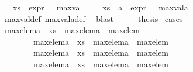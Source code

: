 \begin{isabellebody}
{\isachardoublequoteopen}{\isacharparenleft}{\kern0pt}{\isasymnexists}{\isasympsi}{\isachardot}{\kern0pt}\ {\isasympsi}\ {\isasymin}\ xs\ {\isasymand}\ expr{\isacharunderscore}{\kern0pt}{}\ {\isasympsi}\ {\isacharequal}{\kern0pt}\ max{\isacharunderscore}{\kern0pt}val{\isacharparenright}{\kern0pt}\ {\isasymand}\ {\isacharparenleft}{\kern0pt}{\isasymnexists}{\isasympsi}{\isachardot}{\kern0pt}\ {\isasympsi}\ {\isasymin}\ {\isacharparenleft}{\kern0pt}xs\ {\isasymunion}\ {\isacharbraceleft}{\kern0pt}a{\isacharbraceright}{\kern0pt}{\isacharparenright}{\kern0pt}\ {\isasymand}\ expr{\isacharunderscore}{\kern0pt}{}\ {\isasympsi}\ {\isacharequal}{\kern0pt}\ max{\isacharunderscore}{\kern0pt}val{\isacharunderscore}{\kern0pt}a{\isacharparenright}{\kern0pt}{\isachardoublequoteclose}\isanewline
\ \ \ \ \isamarkupfalse%
\ max{\isacharunderscore}{\kern0pt}val{\isacharunderscore}{\kern0pt}def\ max{\isacharunderscore}{\kern0pt}val{\isacharunderscore}{\kern0pt}a{\isacharunderscore}{\kern0pt}def\ \isamarkupfalse%
\ blast\isanewline
\ \ \isamarkupfalse%
\ \isamarkupfalse%
\ {\isacharquery}{\kern0pt}thesis\ \isamarkupfalse%
{\isacharparenleft}{\kern0pt}cases{\isacharparenright}{\kern0pt}\isanewline
\ \ \ \ \isamarkupfalse%
\ {}\isanewline
\ \ \ \ \isamarkupfalse%
\ {\isachardoublequoteopen}max{\isacharunderscore}{\kern0pt}elem{\isacharunderscore}{\kern0pt}a\ {\isasymin}\ xs\ {\isasymand}\ max{\isacharunderscore}{\kern0pt}elem{\isacharunderscore}{\kern0pt}a\ {\isacharequal}{\kern0pt}\ max{\isacharunderscore}{\kern0pt}elem{\isachardoublequoteclose}\ {\isacharbar}{\kern0pt}\isanewline
\ \ \ \ \ \ \ \ {\isachardoublequoteopen}max{\isacharunderscore}{\kern0pt}elem{\isacharunderscore}{\kern0pt}a\ {\isasymin}\ xs\ {\isasymand}\ max{\isacharunderscore}{\kern0pt}elem{\isacharunderscore}{\kern0pt}a\ {\isasymnoteq}\ max{\isacharunderscore}{\kern0pt}elem{\isachardoublequoteclose}\ {\isacharbar}{\kern0pt}\isanewline
\ \ \ \ \ \ \ \ {\isachardoublequoteopen}max{\isacharunderscore}{\kern0pt}elem{\isacharunderscore}{\kern0pt}a\ {\isasymnotin}\ xs\ {\isasymand}\ max{\isacharunderscore}{\kern0pt}elem{\isacharunderscore}{\kern0pt}a\ {\isacharequal}{\kern0pt}\ max{\isacharunderscore}{\kern0pt}elem{\isachardoublequoteclose}\ {\isacharbar}{\kern0pt}\isanewline
\ \ \ \ \ \ \ \ {\isachardoublequoteopen}max{\isacharunderscore}{\kern0pt}elem{\isacharunderscore}{\kern0pt}a\ {\isasymnotin}\ xs\ {\isasymand}\ max{\isacharunderscore}{\kern0pt}elem{\isacharunderscore}{\kern0pt}a\ {\isasymnoteq}\ max{\isacharunderscore}{\kern0pt}elem{\isachardoublequoteclose}\isanewline

\end{isabellebody}
